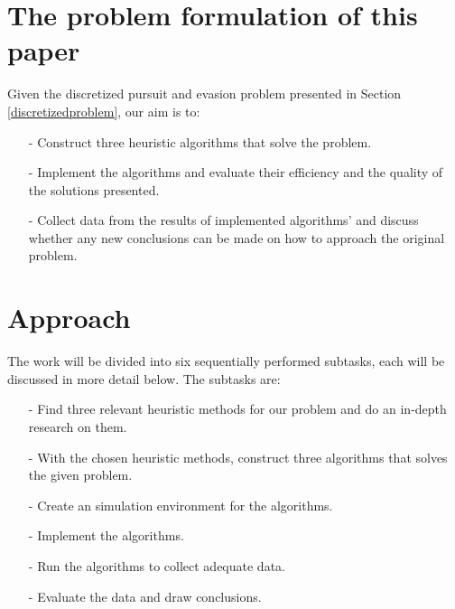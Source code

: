 \section{The problem formulation of this paper}
Given the discretized pursuit and evasion problem presented in Section \ref{discretizedproblem}, our aim is to:
\begin{enumerate}
\item[-] Construct three heuristic algorithms that solve the problem.
\item[-] Implement the algorithms and evaluate their efficiency and the quality of the solutions presented.
\item[-] Collect data from the results of implemented algorithms' and discuss whether any new conclusions can be made on how to approach the original problem.
\end{enumerate}
\section{Approach}
The work will be divided into six sequentially performed subtasks, each will be discussed in more detail below. The subtasks are:
\begin{enumerate}
\item[-] Find three relevant heuristic methods for our problem and do an in-depth research on them.
\item[-] With the chosen heuristic methods, construct three algorithms that solves the given problem.
\item[-] Create an simulation environment for the algorithms.
\item[-] Implement the algorithms.
\item[-] Run the algorithms to collect adequate data.
\item[-] Evaluate the data and draw conclusions.
\end{enumerate}

